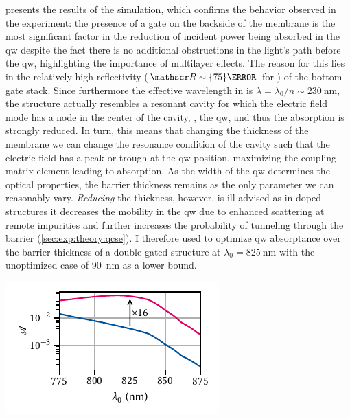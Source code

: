  presents the results of the simulation, which confirms the behavior observed in the experiment: the presence of a gate on the backside of the membrane is the most significant factor in the reduction of incident power being absorbed in the \gls{qw} despite the fact there is no additional obstructions in the light's path before the \gls{qw}, highlighting the importance of multilayer effects.
The reason for this lies in the relatively high reflectivity ($\reflectance\sim\qty{75}{\percent}$ for ) of the bottom gate stack.
Since furthermore the effective wavelength in  is $\lambda = \lambda_0/n\sim\qty{230}{\nano\meter}$, the structure actually resembles a resonant cavity for which the electric field mode has a node in the center of the cavity, \ie, the \gls{qw}, and thus the absorption is strongly reduced.
In turn, this means that changing the thickness of the membrane we can change the resonance condition of the cavity such that the electric field has a peak or trough at the \gls{qw} position, maximizing the coupling matrix element leading to absorption.
As the width of the \gls{qw} determines the optical properties, the  barrier thickness remains as the only parameter we can reasonably vary.
\emph{Reducing} the thickness, however, is ill-advised as in doped structures it decreases the mobility in the \gls{qw} due to enhanced scattering at remote impurities and further increases the probability of tunneling through the barrier (\cf \cref{sec:exp:theory:qcse}).
I therefore used \pymoosh to optimize \gls{qw} absorptance over the barrier thickness of a double-gated structure at $\lambda_0 = \qty{825}{\nano\meter}$ with the unoptimized case of \qty{90}{\nano\meter} as a lower bound.

\begin{marginfigure}[*-10]
    \centering
    \includegraphics{img/pdf/experiment/tmm_absorptance}
    \caption[]{
        \Gls{qw} absorptance \absorptance in a heterostructure with default (blue) and optimized (magenta) barrier thickness and top and bottom gates as function of wavelength.
        Optimization was performed at \qty{825}{\nano\meter} using the differential evolution algorithm implemented in \pymoosh, resulting in a barrier thickness of \qty{122}{\nano\meter} and an absorptance better by a factor of \num{16} at \qty{6.3}{\percent}.
    }
    \label{fig:exp:tmm:wavelengths}
\end{marginfigure}

